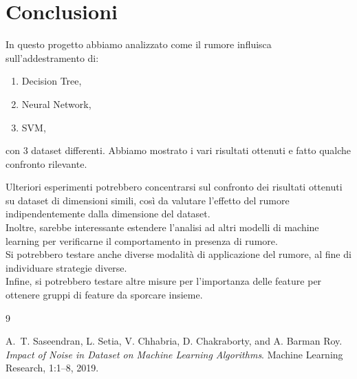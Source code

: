 \documentclass{article}
\begin{document}
\newpage
\section{Conclusioni}
In questo progetto abbiamo analizzato come il rumore influisca sull’addestramento di:
\begin{enumerate}
    \item Decision Tree,
    \item Neural Network,
    \item SVM,
\end{enumerate}


con 3 dataset differenti.
Abbiamo mostrato i vari risultati ottenuti e fatto qualche confronto rilevante.
\par
Ulteriori esperimenti potrebbero concentrarsi sul confronto dei risultati ottenuti su dataset di dimensioni simili, così da valutare l'effetto del rumore indipendentemente dalla dimensione del dataset.\\
Inoltre, sarebbe interessante estendere l'analisi ad altri modelli di machine learning per verificarne il comportamento in presenza di rumore. \\
Si potrebbero testare anche diverse modalità di applicazione del rumore, al fine di individuare strategie diverse.\\
Infine, si potrebbero testare altre misure per l’importanza delle feature per ottenere gruppi di feature da sporcare insieme.


\begin{thebibliography}{9}

A.~T. Saseendran, L. Setia, V. Chhabria, D. Chakraborty, and A. Barman Roy.
\newblock \emph{Impact of Noise in Dataset on Machine Learning Algorithms}.
\newblock Machine Learning Research, 1:1--8, 2019.

\end{thebibliography}
\end{document}
